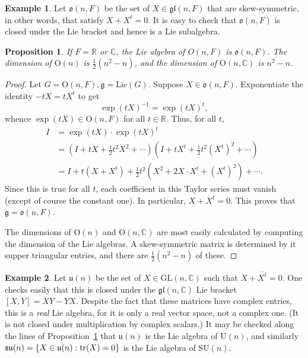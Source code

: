 \documentclass[12pt,reqno]{book}%
\newtheorem{proposition}{Proposition}[chapter]
\theoremstyle{definition}
\newtheorem{example}{Example}[chapter]
\theoremstyle{remark}
\theoremstyle{theorem}
\theoremstyle{remark}
\begin{document}
\begin{example}\label{}
    Let $\mathfrak{o}(n,F)$ be the set of $X \in \mathfrak{gl}(n,F)$ that are skew-symmetric, in other words, that satisfy $X + X^t = 0$.
    It is easy to check that $\mathfrak{o}(n,F)$ is closed under the Lie bracket and hence is a Lie subalgebra.
\end{example}

\begin{proposition}\label{prop5.6}%
    If $F = \mathbb{R}$ or $\mathbb{C}$, the Lie algebra of $O(n,F)$ is $\mathfrak{o}(n,F)$.
    The dimension of $\mathrm{O}(n)$ is $\frac{1}{2}(n^2 - n)$, and the dimension of $\mathrm{O}(n, \mathbb{C})$ is $n^2 - n$.
\end{proposition}%
\begin{proof}%
    Let $G = \mathrm{O}(n,F), \mathfrak{g} = \mathrm{Lie}(G)$.
    Suppose $X \in \mathfrak{o}(n,F)$.
    Exponentiate the identity $-tX = tX^t$ to get
    \[
        \exp(tX)^{-1} = {\exp(tX)}^{t},
    \]
    whence $\exp(tX) \in \mathrm{O}(n,F)$ for all $t \in \mathbb{R}$.
    Thus, for all $t$,
    \begin{align*}
        I &= \exp(tX) \cdot {\exp(tX)}^{t} \\
        &= (I + tX + \frac{1}{2}t^2X^2 + \cdots ) (I + tX^t + \frac{1}{2} t^2(X^t)^2 + \cdots ) \\
        &= I + t(X + X^t) + \frac{1}{2}t^2(X^2 + 2X \cdot X^t  +(X^t)^2) + \cdots.
    \end{align*}
    Since this is true for all $t$, each coefficient in this Taylor series must vanish (except of course the constant one).
    In particular, $X + X^t = 0$.
    This proves that $\mathfrak{g} = \mathfrak{o}(n,F)$.

    The dimensions of $\mathrm{O}(n)$ and $\mathrm{O}(n, \mathbb{C})$ are most easily calculated by computing the dimension of the Lie algebras.
    A skew-symmetric matrix is determined by it supper triangular entries, and there are $\frac{1}{2}(n^2 - n)$ of these.
\end{proof}%

\begin{example}\label{}
    Let $\mathfrak{u}(n)$ be the set of $X \in \mathrm{GL}(n, \mathbb{C})$ such that $X + \overline{X^t} = 0$.
    One checks easily that this is closed under the $\mathfrak{gl}(n, \mathbb{C})$ Lie bracket $[X, Y] = XY - YX$.
    Despite the fact that these matrices have complex entries, this is a \emph{real} Lie algebra, for it is only a real vector space, not a complex one.
    (It is not closed under multiplication by complex scalars.)
    It may be checked along the lines of Proposition~\ref{prop5.6} that $\mathfrak{u}(n)$ is the Lie algebra of $\mathrm{U}(n)$, and similarly $\mathfrak{su}(n) = \{X \in \mathfrak{u}(n) : \tr(X) = 0\}$ is the Lie algebra of $\mathrm{SU}(n)$.
\end{example}
\end{document}
